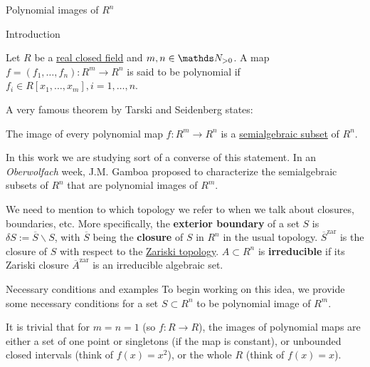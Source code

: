 \documentclass[11pt, a4paper, english, twoside, notitlepage]{report}
\begin{document}
\begin{chapter}{Polynomial images of $R^n$}

\begin{section}{Introduction}
	\begin{definition}\label{polyMap}
	Let $R$ be a \hyperref[realCField]{real closed field} and $m, n \in \N_{>0}$. A map $f = (f_1, \dots, f_n): R^m \longrightarrow R^n$ is said to be polynomial if $f_i \in R[x_1, \dots, x_m], i = 1,\dots, n$. 
	\end{definition}
	
	A very famous theorem by Tarski and Seidenberg states:
	\begin{theorem}\label{tarskiSeidenberg}
	The image of every polynomial map $f: R^m \longrightarrow R^n$ is a \hyperref[semialgSet]{semialgebraic subset} of $R^n$.
	\end{theorem}
	
	In this work we are studying sort of a converse of this statement. In an \emph{Oberwolfach} week, J.M. Gamboa proposed to characterize the semialgebraic subsets of $R^n$ that are polynomial images of $R^m$.
	
	
	\begin{notation}
	We need to mention to which topology we refer to when we talk about closures, boundaries, etc. More specifically, the \textbf{exterior boundary} of a set $S$ is $\delta S := \overline{S} \backslash S$, with $\overline{S}$ being the \textbf{closure} of $S$ in $R^n$ in the usual topology. $\overline{S}^{\text{zar}}$ is the closure of $S$ with respect to the \hyperref[zariski]{Zariski topology}. $A\subset R^n$ is \textbf{irreducible} if its Zariski closure $\overline{A}^{\text{zar}}$ is an irreducible algebraic set.
	\end{notation}
	
	\begin{subsection}{Necessary conditions and examples}
	To begin working on this idea, we provide some necessary conditions for a set $S\subset R^n$ to be polynomial image of $R^m$. 
	
	It is trivial that for $m = n = 1$ (so $f: R \rightarrow R$), the images of polynomial maps are either a set of one point or singletons (if the map is constant), or unbounded closed intervals (think of $f(x) = x^2$), or the whole $R$ (think of $f(x) = x$).
	

\end{subsection}
\end{section}
\end{chapter}
\end{document}
